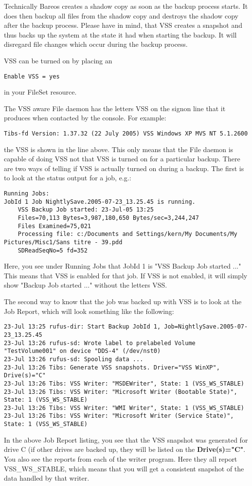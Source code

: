 Technically Bareos creates a shadow copy as soon as the backup process
starts. It does then backup all files from the shadow copy and destroys the
shadow copy after the backup process. Please have in mind, that VSS
creates a snapshot and thus backs up the system at the state it had
when starting the backup. It will disregard file changes which occur during
the backup process.

VSS can be turned on by placing an

\begin{verbatim}
Enable VSS = yes
\end{verbatim}

in your FileSet resource.

The VSS aware File daemon has the letters VSS on the signon line that
it produces when contacted by the console. For example:
\begin{verbatim}
Tibs-fd Version: 1.37.32 (22 July 2005) VSS Windows XP MVS NT 5.1.2600
\end{verbatim}
the VSS is shown in the line above. This only means that the File daemon
is capable of doing VSS not that VSS is turned on for a particular backup.
There are two ways of telling if VSS is actually turned on during a backup.
The first is to look at the status output for a job, e.g.:
\footnotesize
\begin{verbatim}
Running Jobs:
JobId 1 Job NightlySave.2005-07-23_13.25.45 is running.
    VSS Backup Job started: 23-Jul-05 13:25
    Files=70,113 Bytes=3,987,180,650 Bytes/sec=3,244,247
    Files Examined=75,021
    Processing file: c:/Documents and Settings/kern/My Documents/My Pictures/Misc1/Sans titre - 39.pdd
    SDReadSeqNo=5 fd=352
\end{verbatim}
\normalsize
Here, you see under Running Jobs that JobId 1 is "VSS Backup Job started ..."
This means that VSS is enabled for that job.  If VSS is not enabled, it will
simply show "Backup Job started ..." without the letters VSS.

The second way to know that the job was backed up with VSS is to look at the
Job Report, which will look something like the following:
\footnotesize
\begin{verbatim}
23-Jul 13:25 rufus-dir: Start Backup JobId 1, Job=NightlySave.2005-07-23_13.25.45
23-Jul 13:26 rufus-sd: Wrote label to prelabeled Volume "TestVolume001" on device "DDS-4" (/dev/nst0)
23-Jul 13:26 rufus-sd: Spooling data ...
23-Jul 13:26 Tibs: Generate VSS snapshots. Driver="VSS WinXP", Drive(s)="C"
23-Jul 13:26 Tibs: VSS Writer: "MSDEWriter", State: 1 (VSS_WS_STABLE)
23-Jul 13:26 Tibs: VSS Writer: "Microsoft Writer (Bootable State)", State: 1 (VSS_WS_STABLE)
23-Jul 13:26 Tibs: VSS Writer: "WMI Writer", State: 1 (VSS_WS_STABLE)
23-Jul 13:26 Tibs: VSS Writer: "Microsoft Writer (Service State)", State: 1 (VSS_WS_STABLE)
\end{verbatim}
\normalsize
In the above Job Report listing, you see that the VSS snapshot was generated for drive C (if
other drives are backed up, they will be listed on the {\bf Drive(s)="C"}.  You also see the
reports from each of the writer program.  Here they all report VSS\_WS\_STABLE, which means
that you will get a consistent snapshot of the data handled by that writer.

